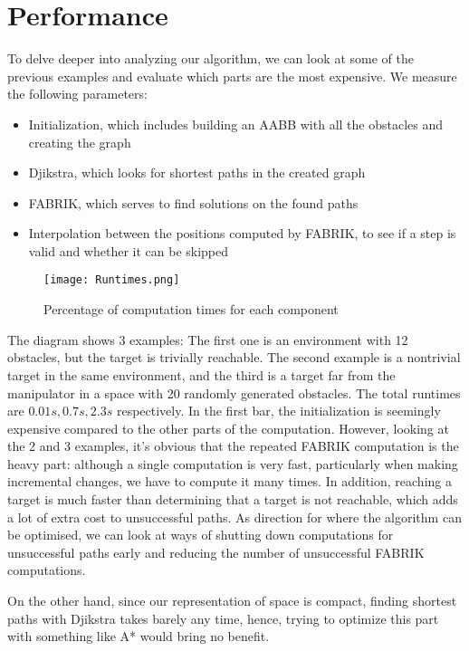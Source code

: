 \section{Performance}

To delve deeper into analyzing our algorithm, we can look at some of the previous examples and evaluate which parts are the most expensive. We measure the following parameters:

\begin{itemize}
\item Initialization, which includes building an AABB with all the obstacles and creating the graph
\item Djikstra, which looks for shortest paths in the created graph
\item FABRIK, which serves to find solutions on the found paths
\item Interpolation between the positions computed by FABRIK, to see if a step is valid and whether it can be skipped
\end{itemize}

\begin{wrapfigure}{r}{0.50\textwidth}
  \centering
  \texttt{[image: Runtimes.png]}
  \caption{Percentage of computation times for each component}
\end{wrapfigure}

The diagram shows 3 examples: The first one is an environment with 12 obstacles, but the target is trivially reachable. The second example is a nontrivial target in the same environment, and the third is a target far from the manipulator in a space with 20 randomly generated obstacles. The total runtimes are $0.01s, 0.7s, 2.3s$ respectively. In the first bar, the initialization is seemingly expensive compared to the other parts of the computation. However, looking at the 2\nd{} and 3\rd{} examples, it's obvious that the repeated FABRIK computation is the heavy part: although a single computation is very fast, particularly when making incremental changes, we have to compute it many times. In addition, reaching a target is much faster than determining that a target is not reachable, which adds a lot of extra cost to unsuccessful paths. As direction for where the algorithm can be optimised, we can look at ways of shutting down computations for unsuccessful paths early and reducing the number of unsuccessful FABRIK computations.

On the other hand, since our representation of space is compact, finding shortest paths with Djikstra takes barely any time, hence, trying to optimize this part with something like A* would bring no benefit.

